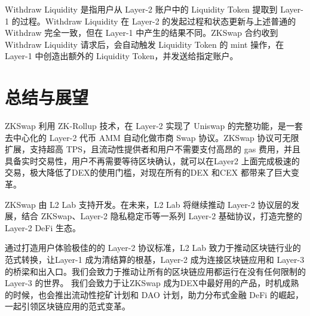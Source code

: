 \documentclass[]{template/llncs}
\begin{document}
Withdraw Liquidity 是指用户从 Layer-2 账户中的 Liquidity Token 提取到 Layer-1 的过程。Withdraw Liquidity 在 Layer-2 的发起过程和状态更新与上述普通的 Withdraw 完全一致，但在 Layer-1 中产生的结果不同。ZKSwap 合约收到 Withdraw Liquidity 请求后，会自动触发 Liquidity Token 的 mint 操作，在 Layer-1 中创造出额外的 Liquidity Token，并发送给指定账户。


\section{总结与展望}

ZKSwap 利用 ZK-Rollup 技术，在 Layer-2 实现了 Uniswap 的完整功能，是一套去中心化的 Layer-2 代币 AMM 自动化做市商 Swap 协议。ZKSwap 协议可无限扩展，支持超高 TPS，且流动性提供者和用户不需要支付高昂的 gas 费用，并且具备实时交易性，用户不再需要等待区块确认，就可以在Layer2 上面完成极速的交易，极大降低了DEX的使用门槛，对现在所有的DEX 和CEX 都带来了巨大变革。

ZKSwap 由 L2 Lab 支持开发。在未来，L2 Lab 将继续推动 Layer-2 协议层的发展，结合 ZKSwap、Layer-2 隐私稳定币等一系列 Layer-2 基础协议，打造完整的 Layer-2 DeFi 生态。

通过打造用户体验极佳的的 Layer-2 协议标准，L2 Lab 致力于推动区块链行业的范式转换，让Layer-1 成为清结算的根基，Layer-2 成为连接区块链应用和 Layer-3 的桥梁和出入口。我们会致力于推动让所有的区块链应用都运行在没有任何限制的 Layer-3 的世界。
我们会致力于让ZKSwap 成为DEX中最好用的产品，时机成熟的时候，也会推出流动性挖矿计划和 DAO 计划，助力分布式金融 DeFi 的崛起，一起引领区块链应用的范式变革。




\end{document}
